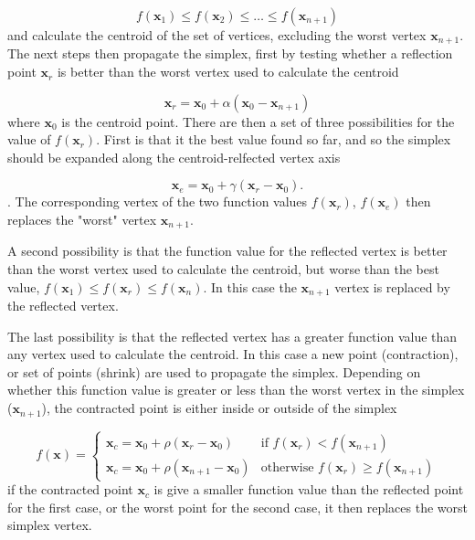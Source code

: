 \begin{equation}
f\left(\mathbf{x}_1\right) \leq f\left(\mathbf{x}_2\right) \leq \dots \leq f\left(\mathbf{x}_{n+1}\right)
\end{equation}
%
and calculate the centroid of the set of vertices, excluding the worst vertex 
$\mathbf{x}_{n+1}$. The next steps then propagate the simplex, first by testing 
whether a reflection point $\mathbf{x}_r$ is better than the worst vertex used to
calculate the centroid

\begin{equation}
\mathbf{x}_r = \mathbf{x}_0 + \alpha\left(\mathbf{x}_0 - \mathbf{x}_{n+1}\right) 
\end{equation}
%
where $\mathbf{x}_0$ is the centroid point. There are then a set of three possibilities
for the value of $f\left(\mathbf{x}_r\right)$. First is that it the best value
found so far, and so the simplex should be expanded along the centroid-relfected 
vertex axis

\begin{equation}
\mathbf{x}_e = \mathbf{x}_0 + \gamma\left(\mathbf{x}_r - \mathbf{x}_0 \right).
\end{equation}
%
. The corresponding vertex of the two function values $f\left(\mathbf{x}_r\right)$, 
$f\left(\mathbf{x}_e\right)$ then replaces the "worst" vertex $\mathbf{x}_{n+1}$.

A second possibility is that the function value for the reflected vertex is better
than the worst vertex used to calculate the centroid, but worse than the best 
value, $f\left(\mathbf{x}_1\right) \leq f\left(\mathbf{x}_r\right) \leq f\left(\mathbf{x}_n\right)$.
In this case the $\mathbf{x}_{n+1}$ vertex is replaced by the reflected vertex.

The last possibility is that the reflected vertex has a greater function value than
any vertex used to calculate the centroid. In this case a new point (contraction),
or set of points (shrink) are used to propagate the simplex. Depending on whether
this function value is greater or less than the worst vertex in the simplex ($\mathbf{x}_{n+1}$),
the contracted point is either inside or outside of the simplex

\begin{equation}
    f\left(\mathbf{x}\right)= 
    \begin{cases}
    \mathbf{x}_c = \mathbf{x}_0 + \rho \left(\mathbf{x}_r - \mathbf{x}_0 \right)               & \text{if } f\left(\mathbf{x}_r\right) < f\left(\mathbf{x}_{n+1}\right)\\
    \mathbf{x}_c = \mathbf{x}_0 + \rho \left(\mathbf{x}_{n+1} - \mathbf{x}_0 \right)           & \text{otherwise } f\left(\mathbf{x}_r\right) \geq f\left(\mathbf{x}_{n+1}\right)
    \end{cases}
\end{equation}
%
if the contracted point $\mathbf{x}_c$ is give a smaller function value than the 
reflected point for the first case, or the worst point for the second case, it then
replaces the worst simplex vertex.

